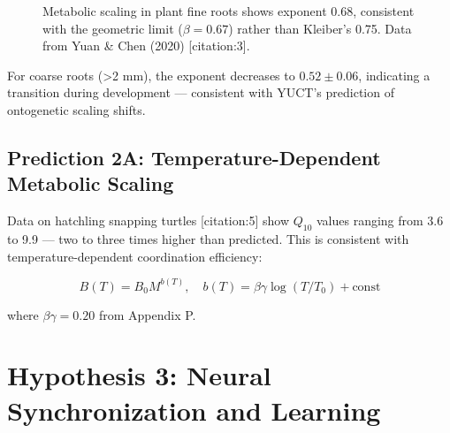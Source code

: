 \documentclass[11pt]{article}
\begin{document}
	\begin{figure}[h]
		\centering
		\caption{Metabolic scaling in plant fine roots shows exponent 0.68, consistent with the geometric limit (\(\beta=0.67\)) rather than Kleiber's 0.75. Data from Yuan \& Chen (2020) [citation:3].}
		\label{fig:plant-scaling}
	\end{figure}
	
	For coarse roots (>2 mm), the exponent decreases to \(0.52 \pm 0.06\), indicating a transition during development — consistent with YUCT's prediction of ontogenetic scaling shifts.
	
	\subsection{Prediction 2A: Temperature-Dependent Metabolic Scaling}
	
	Data on hatchling snapping turtles [citation:5] show \(Q_{10}\) values ranging from 3.6 to 9.9 — two to three times higher than predicted. This is consistent with temperature-dependent coordination efficiency:
	
	\begin{equation}
		B(T) = B_0 M^{b(T)}, \quad b(T) = \beta\gamma \log(T/T_0) + \text{const}
		\label{eq:temp-scaling}
	\end{equation}
	
	where \(\beta\gamma = 0.20\) from Appendix P.
	
	\section{Hypothesis 3: Neural Synchronization and Learning}
	
\end{document}
